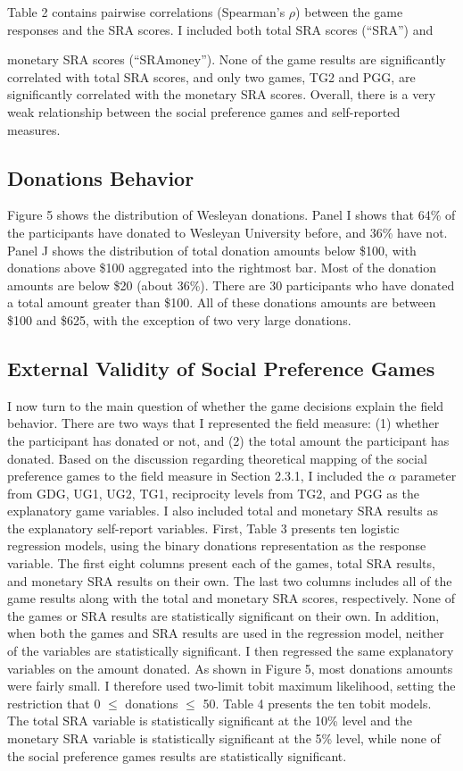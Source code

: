 \documentclass[12pt]{article}
\begin{document}
Table 2 contains pairwise correlations (Spearman\rq s \(\rho\)) between the game responses and the SRA scores. I included both total SRA scores (``SRA'') and {\color{red}monetary SRA scores (``SRAmoney'')\). None of the game results are significantly correlated with total SRA scores, and only two games, TG2 and PGG, are significantly correlated with the monetary SRA scores. Overall, there is a very weak relationship between the social preference games and self-reported measures. 

\subsection{Donations Behavior}

Figure 5 shows the distribution of Wesleyan donations. Panel I shows that 64\% of the participants have donated to Wesleyan University before, and 36\% have not. Panel J shows the distribution of total donation amounts below \$100, with donations above \$100 aggregated into the rightmost bar. Most of the donation amounts are below \$20 (about 36\%). There are 30 participants who have donated a total amount greater than \$100. All of these donations amounts are between \$100 and \$625, with the exception of two very large donations.

\subsection{External Validity of Social Preference Games}
I now turn to the main question of whether the game decisions explain the field behavior. There are two ways that I represented the field measure: (1) whether the participant has donated or not, and (2) the total amount the participant has donated. Based on the discussion regarding theoretical mapping of the social preference games to the field measure in Section 2.3.1, I included the \(\alpha\) parameter from GDG, UG1, UG2, TG1, reciprocity levels from TG2, and PGG as the explanatory game variables. I also included total and monetary SRA results as the explanatory self-report variables. First, Table 3 presents ten logistic regression models, using the binary donations representation as the response variable. The first eight columns present each of the games, total SRA results, and monetary SRA results on their own. The last two columns includes all of the game results along with the total and monetary SRA scores, respectively. None of the games or SRA results are statistically significant on their own. In addition, when both the games and SRA results are used in the regression model, neither of the variables are statistically significant. I then regressed the same explanatory variables on the amount donated. As shown in Figure 5, most donations amounts were fairly small. I therefore used two-limit tobit maximum likelihood, setting the restriction that 0 $\leq$ donations $\leq$ 50.  Table 4 presents the ten tobit models. The total SRA variable is statistically significant at the 10\% level and the monetary SRA variable is statistically significant at the 5\% level, while none of the social preference games results are statistically significant.

}
\end{document}
